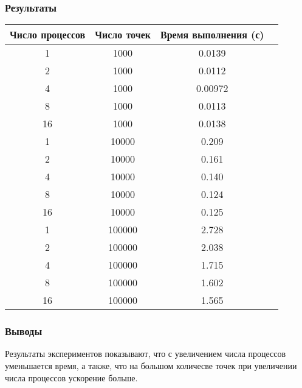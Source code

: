 \documentclass[12pt]{article}
\begin{document}
\subsubsection*{Результаты}
\begin{tabular}{|c|c|c|c|}
    \hline
    Число процессов & Число точек      & Время выполнения (с) \\ \hline
    1               & 1000         & 0.0139                   \\ \hline
    2               & 1000         & 0.0112                   \\ \hline
    4               & 1000         & 0.00972                  \\ \hline
    8               & 1000         & 0.0113                   \\ \hline
    16              & 1000         & 0.0138                   \\ \hline
    1               & 10000        & 0.209                    \\ \hline
    2               & 10000        & 0.161                    \\ \hline
    4               & 10000        & 0.140                    \\ \hline
    8               & 10000        & 0.124                    \\ \hline
    16              & 10000        & 0.125                    \\ \hline
    1               & 100000       & 2.728                    \\ \hline
    2               & 100000       & 2.038                    \\ \hline
    4               & 100000       & 1.715                    \\ \hline
    8               & 100000       & 1.602                    \\ \hline
    16              & 100000       & 1.565                    \\ \hline
\end{tabular}

\subsubsection*{Выводы}
Результаты экспериментов показывают, что с увеличением числа процессов уменьшается время, а также, что на большом количесве точек при увеличении числа процессов ускорение больше.

\newpage
\end{document}

